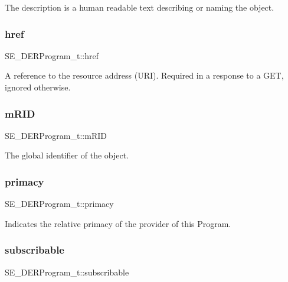 The description is a human readable text describing or naming the object. \mbox{\label{group__DERProgram_ga41e32b7c2ca6700cd42ba11836b2665e}} 
\subsubsection{\texorpdfstring{href}{href}}
{\footnotesize\ttfamily S\+E\+\_\+\+D\+E\+R\+Program\+\_\+t\+::href}

A reference to the resource address (U\+RI). Required in a response to a G\+ET, ignored otherwise. \mbox{\label{group__DERProgram_ga4d3682f58deb708053b4c09c1c63f58f}} 
\subsubsection{\texorpdfstring{m\+R\+ID}{mRID}}
{\footnotesize\ttfamily S\+E\+\_\+\+D\+E\+R\+Program\+\_\+t\+::m\+R\+ID}

The global identifier of the object. \mbox{\label{group__DERProgram_gaefdd7cf83f9d937976f8eacc6433d963}} 
\subsubsection{\texorpdfstring{primacy}{primacy}}
{\footnotesize\ttfamily S\+E\+\_\+\+D\+E\+R\+Program\+\_\+t\+::primacy}

Indicates the relative primacy of the provider of this Program. \mbox{\label{group__DERProgram_ga8798269512f178b07f8d02a1cedd6f54}} 
\subsubsection{\texorpdfstring{subscribable}{subscribable}}
{\footnotesize\ttfamily S\+E\+\_\+\+D\+E\+R\+Program\+\_\+t\+::subscribable}

